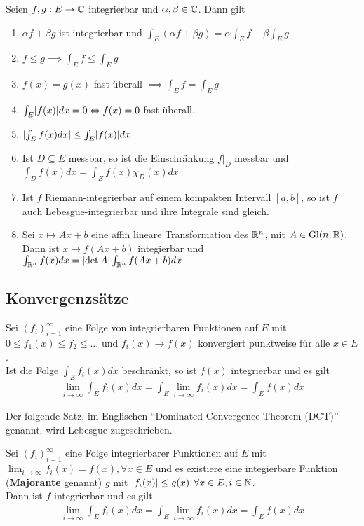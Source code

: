 \begin{satz}
Seien $f,g: E \to \mathbb{C}$ integrierbar und $\alpha, \beta \in \mathbb{C}$. Dann gilt
\begin{enumerate}
\item $\alpha f + \beta g$ ist integrierbar und $\int_E(\alpha f + \beta g) = \alpha \int_Ef + \beta \int_E g$
\item $f \leq g \implies \int_E f \leq \int_E g$
\item $f(x) = g(x)$ fast überall $\implies \int_E f = \int_E g$
\item $\int_E \abs{f(x)} dx = 0 \Leftrightarrow f(x) = 0$ fast überall.
\item $\abs{\int_E f(x) dx} \leq \int_E \abs{f(x)}dx$
\item Ist $D \subseteq E$ messbar, so ist die Einschränkung $f|_D$ messbar und $\int_D f(x) dx = \int_E f(x) \chi_D(x) dx$
\item Ist $f$ Riemann-integrierbar auf einem kompakten Intervall $[a,b]$, so ist $f$ auch Lebesgue-integrierbar und ihre Integrale sind gleich. 
\item	Sei $x \mapsto Ax + b$ eine affin lineare Transformation des $\mathbb{R}^n$, mit $A \in \text{Gl}(n,\mathbb{R})$. Dann ist $x \mapsto f(Ax + b)$ integierbar und $\int_{\R^n} f(x) dx = \abs{\det A} \int_{\R^n}f(Ax+b) dx$
\end{enumerate}
\end{satz}

\subsection{Konvergenzsätze}

\begin{satz}
Sei $\left(f_{i}\right)_{i = 1}^{\infty}$ eine Folge von integrierbaren Funktionen auf $E$ mit $0 \leq f_1(x) \leq f_2 \leq \ldots$ und $f_i(x) \to f(x)$ konvergiert punktweise für alle $x \in E$. \\
Ist die Folge $\int_E f_i(x)dx$ beschränkt, so ist $f(x)$ integrierbar und es gilt
\begin{align*}
		\lim_{i \to \infty}\int_Ef_i(x)dx = \int_E \lim_{i \to \infty}f_i(x)dx = \int_Ef(x)dx
\end{align*}
\end{satz}

Der folgende Satz, im Englischen ``Dominated Convergence Theorem (DCT)'' genannt, wird Lebesgue zugeschrieben.
\begin{satz}
Sei $\left(f_{i}\right)_{i = 1}^{\infty}$ eine Folge integrierbarer Funktionen auf $E$ mit $\lim_{i \to \infty}f_i(x) = f(x), \forall x  \in E$ und es existiere eine integierbare Funktion (\textbf{Majorante}  genannt) $g$ mit $\vert f_i(x)\vert \leq g(x), \forall x \in E, i \in \mathbb{N}$.\\
	Dann ist $f$ integrierbar und es gilt
\begin{align*}
	\lim_{i \to \infty}\int_Ef_i(x)dx = \int_E \lim_{i \to \infty} f_i(x)dx = \int_Ef(x)dx
\end{align*}
\end{satz}


